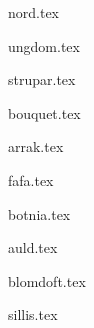 \documentclass[a6paper,8pt,makeidx]{book}
\begin{document}
\addtocounter{songnum}{1}

{nord.tex}
\clearpage

{ungdom.tex}
\clearpage

{strupar.tex}	
\clearpage

{bouquet.tex}	
\clearpage

{arrak.tex}	
\clearpage

{fafa.tex}	
\clearpage

{botnia.tex}	
\clearpage

{auld.tex}	
\clearpage

{blomdoft.tex}
\clearpage

{sillis.tex}
\clearpage


\renewcommand{\idxtitlefont}{\rmfamily\mdseries}
\renewcommand{\idxlyricfont}{\rmfamily\mdseries}
\renewcommand{\idxheadfont}{\sffamily\it\large}
\setlength{\idxheadwidth}{0.5cm}
\end{document}
